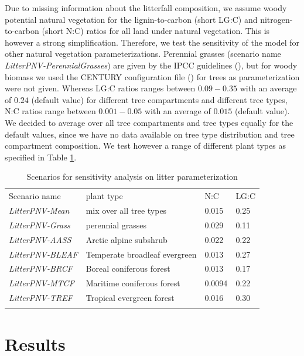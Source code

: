 \documentclass[gc, manuscript]{copernicus}
\begin{document}
Due to missing information about the litterfall composition, we assume woody potential natural vegetation for the lignin-to-carbon (short LG:C) and nitrogen-to-carbon (short N:C) ratios for all land under natural vegetation. This is however a strong simplification. Therefore, we test the sensitivity of the model for other natural vegetation parameterizations. Perennial grasses (scenario name \textit{LitterPNV-PerennialGrasses}) are given by the IPCC guidelines (\citep{calvo_buendia_ipcc_2019}), but for woody biomass we used the CENTURY configuration file (\citep{century_model_2000}) for trees as parameterization were not given. Whereas LG:C ratios ranges between \(0.09-0.35\) with an average of \(0.24\) (default value) for different tree compartments and different tree types, N:C ratios range between \(0.001-0.05\) with an average of \(0.015\) (default value). We decided to average over all tree compartments and tree types equally for the default values, since we have no data available on tree type distribution and tree compartment composition. We test however a range of different plant types as specified in Table \ref{tab:scenlitterpnv}.

 \begin{table}[h]
 \caption{Scenarios for sensitivity analysis on litter parameterization}
 \begin{tabular}{l l l l}
 \tophline
  Scenario name & plant type & N:C & LG:C \\
  \middlehline
  \textit{LitterPNV-Mean} & mix over all tree types & 0.015  & 0.25 \\
  \textit{LitterPNV-Grass} & perennial grasses     & 0.029  & 0.11 \\
  \textit{LitterPNV-AASS}  & Arctic alpine subshrub           & 0.022  & 0.22 \\
  \textit{LitterPNV-BLEAF} & Temperate broadleaf evergreen    & 0.013  & 0.27 \\
  \textit{LitterPNV-BRCF}  & Boreal coniferous forest         & 0.013  & 0.17 \\
  \textit{LitterPNV-MTCF}  & Maritime coniferous forest       & 0.0094 & 0.22 \\
  \textit{LitterPNV-TREF}  & Tropical evergreen forest        & 0.016  & 0.30 \\
 \bottomhline
 \end{tabular}
 \belowtable{}
 \label{tab:scenlitterpnv}
 \end{table}

\newpage

\hypertarget{results}{%
\section{Results}\label{results}}
\end{document}
